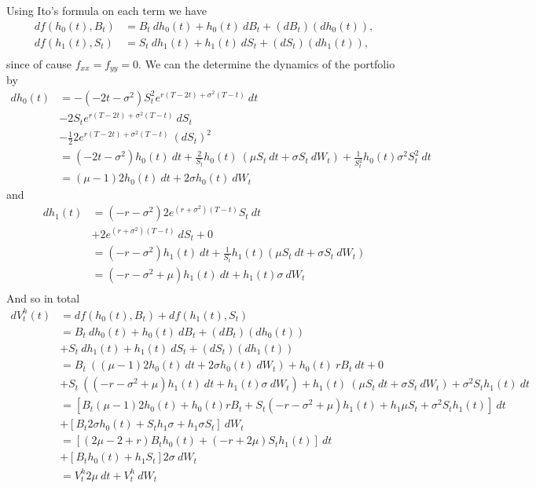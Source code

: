 \documentclass[a4paper,12pt,openany]{book}
\begin{document}
Using Ito's formula on each term we have
\begin{align*}
df(h_0(t),B_t)&=B_t\ dh_0(t)+h_0(t)\ dB_t+(dB_t)(dh_0(t)),\\
df(h_1(t),S_t)&=S_t\ dh_1(t)+h_1(t)\ dS_t+(dS_t)(dh_1(t)),\\
\end{align*}
since of cause \(f_{xx}=f_{yy}=0\). We can the determine the dynamics of the portfolio by
\begin{align*}
dh_0(t)&=-(-2t-\sigma^2)S_t^2e^{r(T-2t)+\sigma^2(T-t)}\ dt\\
&-2S_te^{r(T-2t)+\sigma^2(T-t)}\ dS_t\\
&-\frac{1}{2}2e^{r(T-2t)+\sigma^2(T-t)}\ (dS_t)^2\\
&=(-2t-\sigma^2)h_0(t)\ dt+\frac{2}{S_t}h_0(t)\ (\mu S_t\ dt+\sigma S_t\ dW_t)+\frac{1}{S_t^2}h_0(t) \sigma^2S_t^2\ dt\\
&=(\mu-1)2h_0(t)\ dt+2\sigma h_0(t)\ dW_t
\end{align*}
and
\begin{align*}
dh_1(t)&=(-r-\sigma^2)2e^{(r+\sigma^2)(T-t)}S_t\ dt\\
&+2e^{(r+\sigma^2)(T-t)}\ dS_t+0\\
&=(-r-\sigma^2)h_1(t)\ dt+\frac{1}{S_t}h_1(t)(\mu S_t\ dt+\sigma S_t\ dW_t)\\
&=(-r-\sigma^2+\mu)h_1(t)\ dt+h_1(t)\sigma \ dW_t\\
\end{align*}
And so in total
\begin{align*}
dV_t^h(t)&=df(h_0(t),B_t)+df(h_1(t),S_t)\\
&=B_t\ dh_0(t)+h_0(t)\ dB_t+(dB_t)(dh_0(t))\\
&+S_t\ dh_1(t)+h_1(t)\ dS_t+(dS_t)(dh_1(t))\\
&=B_t\ ((\mu-1)2h_0(t)\ dt+2\sigma h_0(t)\ dW_t)+h_0(t)\ rB_t\ dt+0\\
&+S_t\ ((-r-\sigma^2+\mu)h_1(t)\ dt+h_1(t)\sigma \ dW_t)+h_1(t)\ (\mu S_t\ dt+\sigma S_t\ dW_t)+\sigma^2S_th_1(t)\ dt\\
&=\left[B_t(\mu-1)2h_0(t)+h_0(t)rB_t+S_t(-r-\sigma^2+\mu)h_1(t)+h_1\mu S_t+\sigma^2S_th_1(t)\right]\ dt\\
&+\left[B_t2\sigma h_0(t)+S_th_1\sigma+h_1\sigma S_t\right]\ dW_t\\
&=\left[(2\mu-2+r)B_th_0(t)+(-r+2\mu)S_th_1(t)\right]\ dt\\
&+\left[B_t h_0(t)+h_1 S_t\right]2\sigma\ dW_t\\
&=V_t^h2\mu\ dt+V_t^h\ dW_t
\end{align*}
\end{document}
